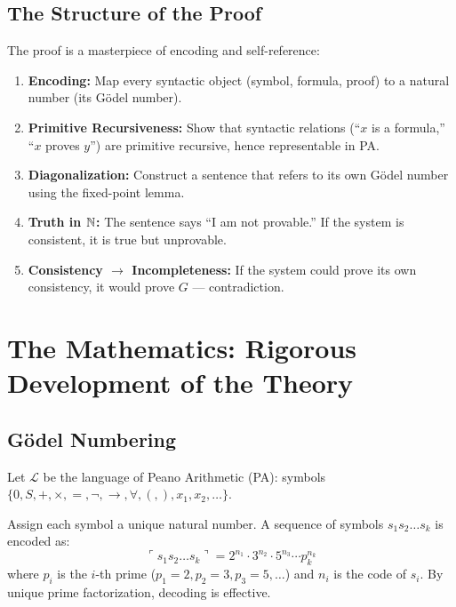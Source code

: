 \subsection*{The Structure of the Proof}

The proof is a masterpiece of encoding and self-reference:

\begin{enumerate}
\item \textbf{Encoding:} Map every syntactic object (symbol, formula, proof) to a natural number (its Gödel number).
\item \textbf{Primitive Recursiveness:} Show that syntactic relations (``$x$ is a formula,'' ``$x$ proves $y$'') are primitive recursive, hence representable in PA.
\item \textbf{Diagonalization:} Construct a sentence that refers to its own Gödel number using the fixed-point lemma.
\item \textbf{Truth in $\mathbb{N}$:} The sentence says ``I am not provable.'' If the system is consistent, it is true but unprovable.
\item \textbf{Consistency $\to$ Incompleteness:} If the system could prove its own consistency, it would prove $G$ --- contradiction.
\end{enumerate}

\section{The Mathematics: Rigorous Development of the Theory}
\label{sec:godel:math}

\subsection{Gödel Numbering}
\label{sec:godel:numbering}

Let $\mathcal{L}$ be the language of Peano Arithmetic (PA): symbols $\{0, S, +, \times, =, \neg, \to, \forall, (, ), x_1, x_2, \dots\}$.

\begin{definition}
Assign each symbol a unique natural number. A sequence of symbols $s_1 s_2 \dots s_k$ is encoded as:
\[
\ulcorner s_1 s_2 \dots s_k \urcorner = 2^{n_1} \cdot 3^{n_2} \cdot 5^{n_3} \cdots p_k^{n_k}
\]
where $p_i$ is the $i$-th prime ($p_1 = 2, p_2 = 3, p_3 = 5, \dots$) and $n_i$ is the code of $s_i$. By unique prime factorization, decoding is effective.
\end{definition}

